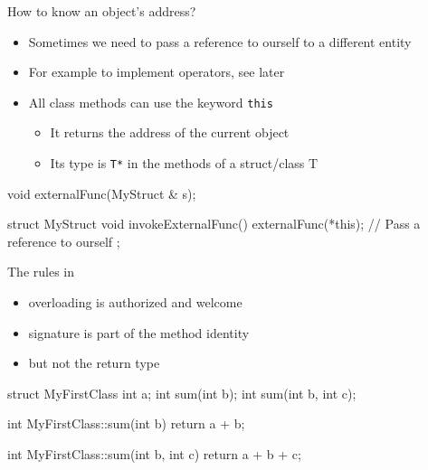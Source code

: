 \begin{frame}[fragile]
  \begin{block}{How to know an object's address?}
    \begin{itemize}
    \item Sometimes we need to pass a reference to ourself to a different entity
    \item For example to implement operators, see later
    \item All class methods can use the keyword \texttt{this}
      \begin{itemize}
        \item It returns the address of the current object
        \item Its type is \texttt{T*} in the methods of a struct/class {\ttfamily T}
      \end{itemize}
    \end{itemize}
  \end{block}
  \begin{cppcode}
    void externalFunc(MyStruct & s);

    struct MyStruct {
      void invokeExternalFunc() {
        externalFunc(*this); // Pass a reference to ourself
      }
    };
  \end{cppcode}
\end{frame}

\begin{frame}[fragile]
  \begin{block}{The rules in \cpp}
    \begin{itemize}
    \item overloading is authorized and welcome
    \item signature is part of the method identity
    \item but not the return type
    \end{itemize}
  \end{block}
  \begin{cppcode}
    struct MyFirstClass {
      int a;
      int sum(int b);
      int sum(int b, int c);
    }

    int MyFirstClass::sum(int b) { return a + b; }

    int MyFirstClass::sum(int b, int c) {
      return a + b + c;
    }
  \end{cppcode}
\end{frame}
